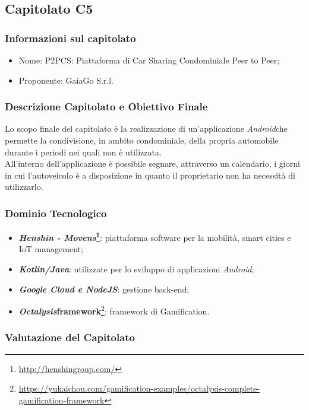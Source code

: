 \subsection{Capitolato C5}\label{C5}

\subsubsection{Informazioni sul capitolato}
\begin{itemize}
  \item{Nome}: P2PCS: Piattaforma di Car Sharing Condominiale Peer to Peer;
  \item{Proponente}: GaiaGo S.r.l.
\end{itemize}

\subsubsection{Descrizione Capitolato e Obiettivo Finale}
Lo scopo finale del capitolato è la realizzazione di un'applicazione \textit{Android}\glossario che permette la condivisione, in ambito condominiale, della propria automobile durante i periodi nei quali non è utilizzata.\\
All'interno dell'applicazione è possibile segnare, attraverso un calendario, i giorni in cui l'autoveicolo è a disposizione in quanto il proprietario non ha necessità di utilizzarlo.

\subsubsection{Dominio Tecnologico}
\begin{itemize}
  \item \textbf{\textit{Henshin - Movens}\footnote{\url{http://henshingroup.com/}}}: piattaforma software per la mobilità, smart cities e IoT management;
  \item \textbf{\textit{Kotlin/Java}}: utilizzate per lo sviluppo di applicazioni \textit{Android};
  \item \textbf{\textit{Google Cloud e NodeJS}}: gestione back-end;
  \item \textbf{\textit{Octalysis}\glossario framework}\footnote{\url{https://yukaichou.com/gamification-examples/octalysis-complete-gamification-framework}}: framework di Gamification\glossario.
  
\end{itemize}

\subsubsection{Valutazione del Capitolato}
